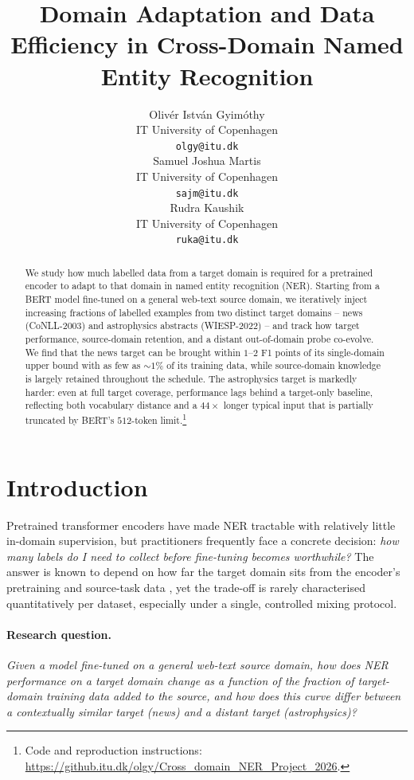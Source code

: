 \documentclass[11pt]{article}
\title{Domain Adaptation and Data Efficiency in Cross-Domain Named Entity Recognition}
\author{
  Oliv\'er Istv\'an Gyim\'othy \\
  IT University of Copenhagen \\
  \texttt{olgy@itu.dk} \\\And
  Samuel Joshua Martis \\
  IT University of Copenhagen \\
  \texttt{sajm@itu.dk} \\\And
  Rudra Kaushik \\
  IT University of Copenhagen \\
  \texttt{ruka@itu.dk} \\
}
\begin{document}
\maketitle

\begin{abstract}
We study how much labelled data from a target domain is required for a
pretrained encoder to adapt to that domain in named entity recognition (NER).
Starting from a BERT model fine-tuned on a general web-text source domain, we
iteratively inject increasing fractions of labelled examples from two distinct
target domains -- news (CoNLL-2003) and astrophysics abstracts (WIESP-2022) --
and track how target performance, source-domain retention, and a distant
out-of-domain probe co-evolve. We find that the news target can be brought
within $1$--$2$ F1 points of its single-domain upper bound with as few as
$\sim$$1$\% of its training data, while source-domain knowledge is largely
retained throughout the schedule. The astrophysics target is markedly harder:
even at full target coverage, performance lags behind a target-only baseline,
reflecting both vocabulary distance and a $44\times$ longer typical input that
is partially truncated by BERT's $512$-token limit.\footnote{Code and reproduction
instructions: \url{https://github.itu.dk/olgy/Cross_domain_NER_Project_2026}.}
\end{abstract}

\section{Introduction}
\label{sec:intro}

Pretrained transformer encoders have made NER tractable with relatively little
in-domain supervision, but practitioners frequently face a concrete decision:
\emph{how many labels do I need to collect before fine-tuning becomes
worthwhile?} The answer is known to depend on how far the target domain sits
from the encoder's pretraining and source-task data
\citep{ramponi-plank-2020-neural,liu-etal-2021-crossner}, yet the trade-off is
rarely characterised quantitatively per dataset, especially under a single,
controlled mixing protocol.

\paragraph{Research question.}
\emph{Given a model fine-tuned on a general web-text source domain, how does
NER performance on a target domain change as a function of the fraction of
target-domain training data added to the source, and how does this curve
differ between a contextually similar target (news) and a distant target
(astrophysics)?}
\end{document}

